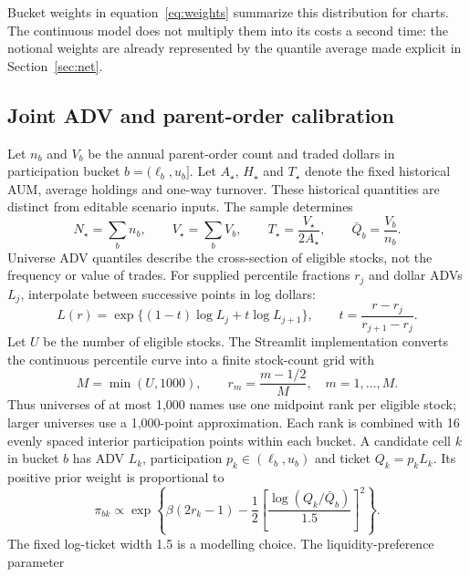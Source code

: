 \documentclass[11pt,a4paper]{article}
\numberwithin{equation}{section}
\begin{document}
Bucket weights in equation~\eqref{eq:weights} summarize this distribution for charts. The
continuous model does not multiply them into its costs a second time: the notional weights
are already represented by the quantile average made explicit in Section~\ref{sec:net}.


\subsection{Joint ADV and parent-order calibration}\label{sec:joint}
Let $n_b$ and $V_b$ be the annual parent-order count and traded dollars in participation bucket
$b=(\ell_b,u_b]$. Let $A_\star$, $H_\star$ and $T_\star$ denote the fixed historical AUM,
average holdings and one-way turnover. These historical quantities are distinct from editable
scenario inputs. The sample determines
\begin{equation}\label{eq:historical}
 N_\star=\sum_b n_b,\qquad V_\star=\sum_b V_b,\qquad
 T_\star=\frac{V_\star}{2A_\star},\qquad \bar Q_b=\frac{V_b}{n_b}.
\end{equation}
Universe ADV quantiles describe the cross-section of eligible stocks, not the frequency or value
of trades. For supplied percentile fractions $r_j$ and dollar ADVs $L_j$, interpolate between
successive points in log dollars:
\begin{equation}\label{eq:advinterpolation}
 L(r)=\exp\{(1-t)\log L_j+t\log L_{j+1}\},\qquad
 t=\frac{r-r_j}{r_{j+1}-r_j}.
\end{equation}
Let $U$ be the number of eligible stocks. The Streamlit implementation converts the continuous
percentile curve into a finite stock-count grid with
\begin{equation}\label{eq:universegrid}
 M=\min(U,1000),\qquad r_m=\frac{m-1/2}{M},\quad m=1,\ldots,M.
\end{equation}
Thus universes of at most 1,000 names use one midpoint rank per eligible stock; larger universes
use a 1,000-point approximation. Each rank is combined with 16 evenly spaced interior
participation points within each bucket. A candidate cell $k$ in bucket $b$ has ADV $L_k$,
participation $p_k\in(\ell_b,u_b)$ and ticket $Q_k=p_kL_k$.
Its positive prior weight is proportional to
\begin{equation}\label{eq:prior}
 \pi_{bk}\propto\exp\left\{\beta(2r_k-1)
 -\frac12\left[\frac{\log(Q_k/\bar Q_b)}{1.5}\right]^2\right\}.
\end{equation}
The fixed log-ticket width 1.5 is a modelling choice. The liquidity-preference parameter
\end{document}
